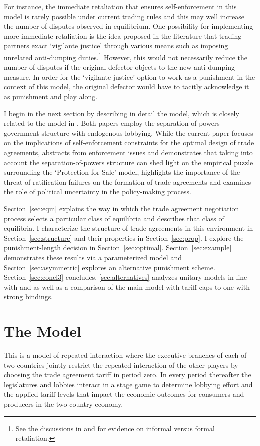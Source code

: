 \documentclass[authoryear, review]{elsarticle}
\begin{document}
For instance, the immediate retaliation that ensures self-enforcement in this model is rarely possible under current trading rules and this may well increase the number of disputes observed in equilibrium. One possibility for implementing more immediate retaliation is the idea proposed in the literature that trading partners exact `vigilante justice' through various means such as imposing unrelated anti-dumping duties.\footnote{See the discussions in \citet{bown2005} and \citet{martinvergote} for evidence on informal versus formal retaliation.} However, this would not necessarily reduce the number of disputes if the original defector objects to the new anti-dumping measure. In order for the `vigilante justice' option to work as a punishment in the context of this model, the original defector would have to tacitly acknowledge it as punishment and play along.

I begin in the next section by describing in detail the model, which is closely related to the model in \citet{buzard2013b}. Both papers employ the separation-of-powers government structure with endogenous lobbying. While the current paper focuses on the implications of self-enforcement constraints for the optimal design of trade agreements, \citet{buzard2013b} abstracts from enforcement issues and demonstrates that taking into account the separation-of-powers structure can shed light on the empirical puzzle surrounding the \citet{gh94} `Protection for Sale' model, highlights the importance of the threat of ratification failures on the formation of trade agreements and examines the role of political uncertainty in the policy-making process.

Section~\ref{sec:eqm} explains the way in which the trade agreement negotiation process selects a particular class of equilibria and describes that class of equilibria. I characterize the structure of trade agreements in this environment in Section~\ref{sec:structure} and their properties in Section~\ref{sec:prop}. I explore the punishment-length decision in Section~\ref{sec:optimal}. Section~\ref{sec:example} demonstrates these results via a parameterized model and Section~\ref{sec:asymmetric} explores an alternative punishment scheme. Section~\ref{sec:concl3} concludes. \ref{sec:alternatives} analyzes unitary models in line with \citet{mrc2007} and \citet{dgh97} as well as a comparison of the main model with tariff caps to one with strong bindings.


\section{The Model}
\label{sec:model}
This is a model of repeated interaction where the executive branches of each of two countries jointly restrict the repeated interaction of the other players by choosing the trade agreement tariff in period zero. In every period thereafter the legislatures and lobbies interact in a stage game to determine lobbying effort and the applied tariff levels that impact the economic outcomes for consumers and producers in the two-country economy. 
\end{document}
